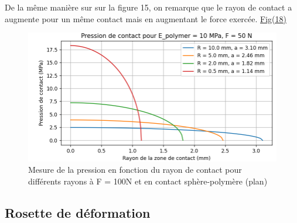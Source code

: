 \documentclass[a4paper,12pt]{article}
\begin{document}
De la même manière sur sur la figure 15, on remarque que le rayon de contact a augmente pour un même contact mais en augmentant le force exercée. \hyperref[fig:mon_image18]{Fig(18)}
\begin{figure}[H] 
	\centering
	\includegraphics[width=1\textwidth]{pre3.png} 
	\caption{Mesure de la pression en fonction du rayon de contact pour différents rayons à F = 100N et en contact sphère-polymère (plan)} 
	\label{fig:mon_image18} 
\end{figure}
\subsection{Rosette de déformation}
\end{document}
